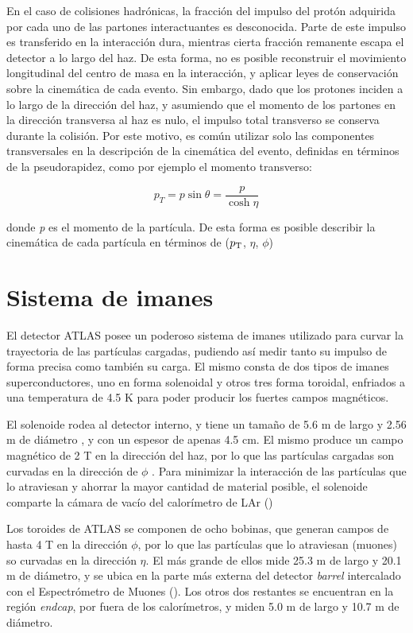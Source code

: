 En el caso de colisiones hadrónicas, la fracción del impulso del protón adquirida por cada uno de las partones interactuantes es desconocida. Parte de este impulso es transferido en la interacción dura, mientras cierta fracción remanente escapa el detector a lo largo del haz. De esta forma, no es posible reconstruir el movimiento longitudinal del centro de masa en la interacción, y aplicar leyes de conservación sobre la cinemática de cada evento. Sin embargo, dado que los protones inciden a lo largo de la dirección del haz, y asumiendo que el momento de los partones en la dirección transversa al haz es nulo, el impulso total transverso se conserva durante la colisión. Por este motivo, es común utilizar solo las componentes transversales en la descripción de la cinemática del evento, definidas en términos de la pseudorapidez, como por ejemplo el momento transverso:

\begin{equation}
p_{T}=p\sin\theta=\frac{p}{\cosh{\eta}}
\end{equation}

\noindent
donde \textit{p} es el momento de la partícula. De esta forma es posible describir la cinemática de cada partícula en términos de ($p_{\text{T}}$, $\eta$, $\phi$)

\section{Sistema de imanes}

El detector ATLAS posee un poderoso sistema de imanes \cite{magnet} utilizado para curvar la trayectoria de las partículas cargadas, pudiendo así medir tanto su impulso de forma precisa como también su carga. El mismo consta de dos tipos de imanes superconductores, uno en forma solenoidal y otros tres forma toroidal, enfriados a una temperatura de 4.5 K para poder producir los fuertes campos magnéticos.

El solenoide rodea al detector interno, y tiene un tamaño de 5.6 m de largo y 2.56 m de diámetro \commentNotaIV, y con un espesor de apenas 4.5 cm. El mismo produce un campo magnético de 2 T en la dirección del haz, por lo que las partículas cargadas son curvadas en la dirección de $\phi$ . Para minimizar la interacción de las partículas que lo atraviesan y ahorrar la mayor cantidad de material posible, el solenoide comparte la cámara de vacío del calorímetro de LAr ()

Los toroides de ATLAS se componen de ocho bobinas, que generan campos de hasta 4 T  en la dirección $\phi$, por lo que las partículas que lo atraviesan (muones) so curvadas en la dirección $\eta$. El más grande de ellos mide 25.3 m de largo y 20.1 m de diámetro, y se ubica en la parte más externa del detector \textit{barrel} intercalado con el Espectrómetro de Muones (). Los otros dos restantes se encuentran en la región \textit{endcap}, por fuera de los calorímetros, y miden 5.0 m de largo y 10.7 m de diámetro. 




